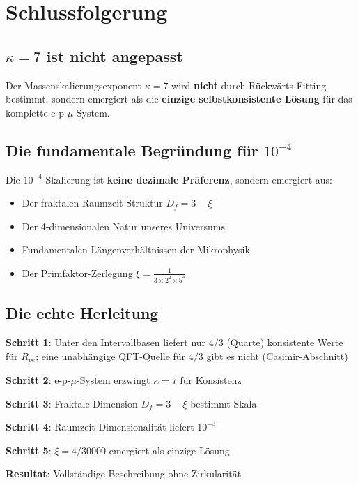 	\section{Schlussfolgerung}
	
	\subsection{$\kappa = 7$ ist nicht angepasst}
	
	Der Massenskalierungsexponent $\kappa = 7$ wird \textbf{nicht} durch Rückwärts-Fitting bestimmt, sondern emergiert als die \textbf{einzige selbstkonsistente Lösung} für das komplette e-p-$\mu$-System.
	
	\subsection{Die fundamentale Begründung für $10^{-4}$}
	
	Die $10^{-4}$-Skalierung ist \textbf{keine dezimale Präferenz}, sondern emergiert aus:
	\begin{itemize}
		\item Der fraktalen Raumzeit-Struktur $D_f = 3 - \xi$
		\item Der 4-dimensionalen Natur unseres Universums
		\item Fundamentalen Längenverhältnissen der Mikrophysik
		\item Der Primfaktor-Zerlegung $\xi = \frac{1}{3 \times 2^2 \times 5^4}$
	\end{itemize}
	
	\subsection{Die echte Herleitung}
	
	\begin{tcolorbox}[colback=green!5!white,colframe=green!75!black,title={Fundamentale Herleitung}]
		\textbf{Schritt 1}: Unter den Intervallbasen liefert nur $4/3$ (Quarte) konsistente Werte für $R_{pe}$; eine unabhängige QFT-Quelle für $4/3$ gibt es nicht (Casimir-Abschnitt)
		
		\textbf{Schritt 2}: e-p-$\mu$-System erzwingt $\kappa = 7$ für Konsistenz
		
		\textbf{Schritt 3}: Fraktale Dimension $D_f = 3 - \xi$ bestimmt Skala
		
		\textbf{Schritt 4}: Raumzeit-Dimensionalität liefert $10^{-4}$
		
		\textbf{Schritt 5}: $\xi = 4/30000$ emergiert als einzige Lösung
		
		\textbf{Resultat}: Vollständige Beschreibung ohne Zirkularität
	\end{tcolorbox}
	
